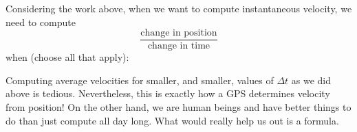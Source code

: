\documentclass{ximera}
\begin{document}
\begin{problem}
  Considering the work above, when we want to compute instantaneous
  velocity, we need to compute
  \[
  \frac{\text{change in position}}{\text{change in time}}
  \]
  when (choose all that apply):
  \begin{multipleResponse}%
  \end{multipleResponse}
\end{problem}


Computing average velocities for smaller, and smaller, values of
$\Delta t$ as we did above is tedious. Nevertheless, this is exactly
how a GPS determines velocity from position! On the other hand, we are
human beings and have better things to do than just compute all day
long. What would really help us out is a formula.
\end{document}
